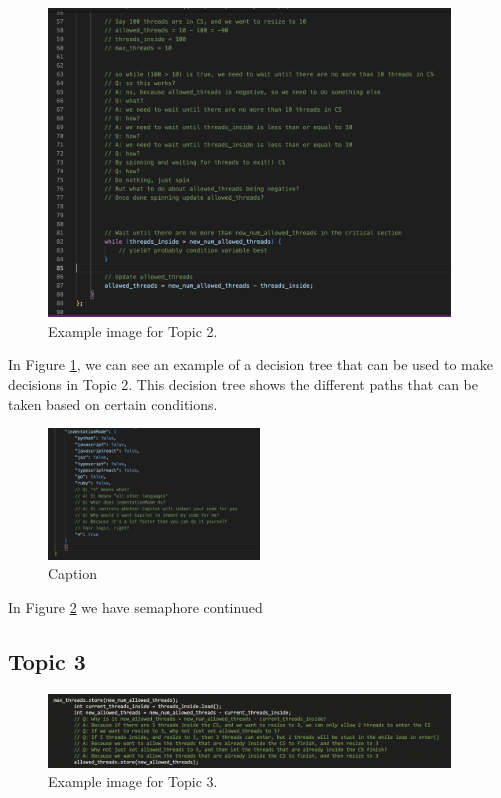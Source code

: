 \documentclass{article}
\begin{document}
\begin{figure}[H]
  \centering
  \includegraphics[width=0.95\textwidth]{semaphore1.png}
  \caption{Example image for Topic 2.}
  \label{fig:semaphore1}
\end{figure}

In Figure \ref{fig:semaphore1}, we can see an example of a decision tree that can be used to make decisions in Topic 2. This decision tree shows the different paths that can be taken based on certain conditions.


\begin{figure}[h]
    \centering
    \includegraphics[width=0.5\textwidth]{image4.png}
    \caption{Caption}
    \label{fig:my_label}
\end{figure}

In Figure \ref{fig:my_label} we have semaphore continued


\subsection{Topic 3}

\begin{figure}[ht]
  \centering
  \includegraphics[width=0.95\textwidth]{semaphore2.png}
  \caption{Example image for Topic 3.}
  \label{fig:semaphore2}
\end{figure}
\end{document}
